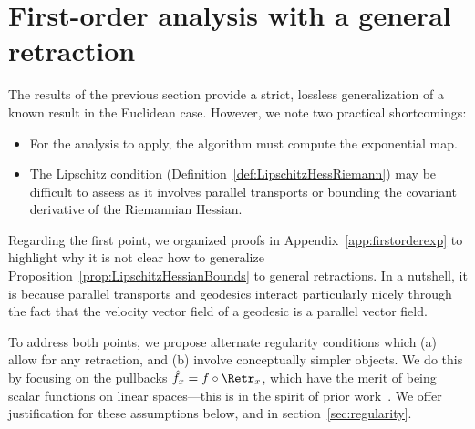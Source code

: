 
\section{First-order analysis with a general retraction}
\label{sec:firstorderanalysisgeneral}

The results of the previous section provide a strict, lossless generalization of a known result in the Euclidean case. However, we note two practical shortcomings:
\begin{itemize}
	\item[--] For the analysis to apply, the algorithm must compute the exponential map. %
	\item[--] The Lipschitz condition (Definition~\ref{def:LipschitzHessRiemann}) may be difficult to assess as it involves parallel transports or bounding the covariant derivative of the Riemannian Hessian.
\end{itemize}
Regarding the first point, we organized proofs in Appendix~\ref{app:firstorderexp} to highlight why it is not clear how to generalize Proposition~\ref{prop:LipschitzHessianBounds} to general retractions. In a nutshell, it is because parallel transports and geodesics interact particularly nicely through the fact that the velocity vector field of a geodesic is a parallel vector field.

To address both points, we propose alternate regularity conditions which (a) allow for any retraction, and (b) involve conceptually simpler objects. We do this by focusing on the pullbacks $\hat f_x = f \circ \Retr_x$, which have the merit of being scalar functions on linear spaces---this is in the spirit of prior work~\citep{boumal2016globalrates}. We offer justification for these assumptions below, and in section~\ref{sec:regularity}.

